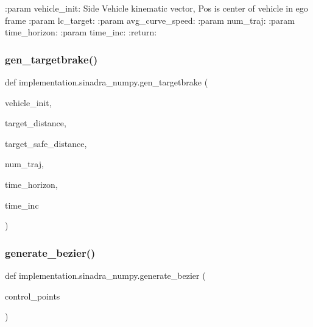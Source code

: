 \begin{DoxyVerb}:param vehicle_init: Side Vehicle kinematic vector, Pos is center of vehicle in ego frame
:param lc_target:
:param avg_curve_speed:
:param num_traj:
:param time_horizon:
:param time_inc:
:return:
\end{DoxyVerb}
 \mbox{\label{namespaceimplementation_1_1sinadra__numpy_a1938fc389773760eebb246250ded1b83}} 
\subsubsection{\texorpdfstring{gen\+\_\+targetbrake()}{gen\_targetbrake()}}
{\footnotesize\ttfamily def implementation.\+sinadra\+\_\+numpy.\+gen\+\_\+targetbrake (\begin{DoxyParamCaption}\item[{}]{vehicle\+\_\+init,  }\item[{}]{target\+\_\+distance,  }\item[{}]{target\+\_\+safe\+\_\+distance,  }\item[{}]{num\+\_\+traj,  }\item[{}]{time\+\_\+horizon,  }\item[{}]{time\+\_\+inc }\end{DoxyParamCaption})}

\mbox{\label{namespaceimplementation_1_1sinadra__numpy_a6340d89002f5f933015712e232c5516b}} 
\subsubsection{\texorpdfstring{generate\+\_\+bezier()}{generate\_bezier()}}
{\footnotesize\ttfamily def implementation.\+sinadra\+\_\+numpy.\+generate\+\_\+bezier (\begin{DoxyParamCaption}\item[{}]{control\+\_\+points }\end{DoxyParamCaption})}


